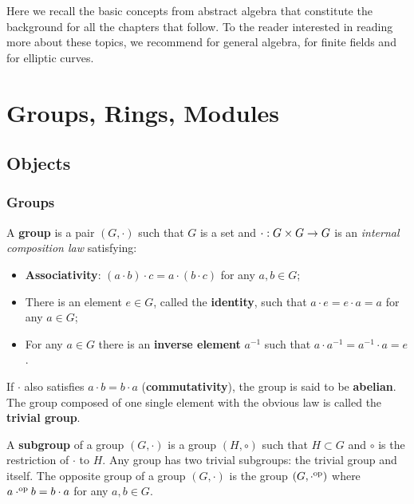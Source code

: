 Here we recall the basic concepts from abstract algebra that
constitute the background for all the chapters that follow. To the
reader interested in reading more about these topics, we recommend
\cite{lang} for general algebra, \cite{lidl+niederreiter:2} for finite
fields and \cite{silverman:elliptic,silverman:advanced} for elliptic
curves.

\section{Groups, Rings, Modules}
\label{sec:ring-fields}

\subsection{Objects}
\label{sec:ring-fields:objects}

\subsubsection{Groups}

A \textbf{group} is a pair $(G,\cdot)$ such that $G$ is a
set and $\cdot:G\times G\rightarrow G$ is an \emph{internal composition law}
satisfying:
\begin{itemize}
\item {}\textbf{Associativity}: $(a\cdot b)\cdot c
  = a \cdot (b\cdot c)$ for any $a,b\in G$;
\item There is an element $e\in G$, called the
  \textbf{identity}, such that $a\cdot e =
  e\cdot a = a$ for any $a\in G$;
\item For any $a\in G$ there is an
  \textbf{inverse element} $a^{-1}$ such that
  $a\cdot a^{-1} = a^{-1}\cdot a = e$.
\end{itemize}
If $\cdot$ also satisfies $a\cdot b=b\cdot a$
(\textbf{commutativity}), the group is said to be
\textbf{abelian}. The group composed of one
single element with the obvious law is called the
\textbf{trivial group}.

A \textbf{subgroup} of a group $(G,\cdot)$ is a group
$(H,\circ)$ such that $H\subset G$ and $\circ$ is the restriction of
$\cdot$ to $H$. Any group has two trivial subgroups: the trivial group
and itself. The 
opposite group of a group $(G,\cdot)$ is
the group $(G,\cdot^{\mathrm{op}})$ where $a\cdot^{\mathrm{op}} b=b\cdot a$ for any
$a,b\in G$.

